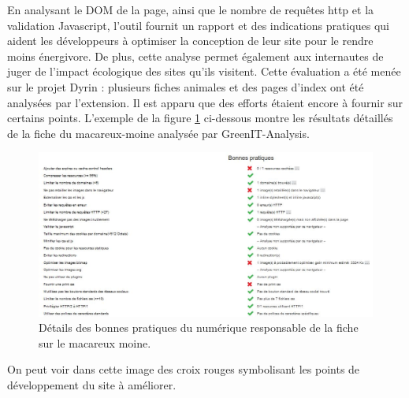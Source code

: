 \documentclass[a4paper,12pt,twoside]{book}
\begin{document}
En analysant le \acrshort{DOM} de la page, ainsi que le nombre de requêtes http et la validation Javascript, l'outil fournit un rapport et des indications pratiques qui aident les développeurs à optimiser la conception de leur site pour le rendre moins énergivore. De plus, cette analyse permet également aux internautes de juger de l'impact écologique des sites qu'ils visitent. Cette évaluation a été menée sur le projet Dyrin : plusieurs fiches animales et des pages d'index ont été analysées par l'extension. Il est apparu que des efforts étaient encore à fournir sur certains points. L'exemple de la figure \ref{bp} ci-dessous montre les résultats détaillés de la fiche du macareux-moine analysée par GreenIT-Analysis.

\begin{figure}[H]
    \centering
    \includegraphics[width=\linewidth]{img/partie_3/bonnes_pratiques.JPG}
    \caption{Détails des bonnes pratiques du numérique responsable de la fiche sur le macareux moine.}
    \label{bp}
\end{figure}

On peut voir dans cette image des croix rouges symbolisant les points de développement du site à améliorer.
\end{document}
